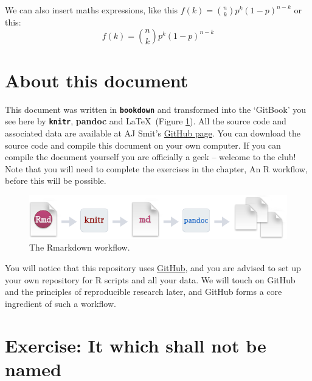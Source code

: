 \documentclass[
]{book}
\begin{document}
We can also insert maths expressions, like this \(f(k) = {n \choose k} p^{k} (1-p)^{n-k}\) or this: \[f(k) = {n \choose k} p^{k} (1-p)^{n-k}\]

\hypertarget{about-this-document}{%
\section{About this document}\label{about-this-document}}

This document was written in \textbf{\texttt{bookdown}} and transformed into the `GitBook' you see here by \textbf{\texttt{knitr}}, \textbf{pandoc} and \LaTeX~(Figure \ref{fig:rmarkdown}). All the source code and associated data are available at AJ Smit's \href{https://github.com/ajsmit/Intro_R_Workshop}{GitHub page}. You can download the source code and compile this document on your own computer. If you can compile the document yourself you are officially a geek -- welcome to the club! Note that you will need to complete the exercises in the chapter, An R workflow, before this will be possible.

\begin{figure}

{\centering \includegraphics[width=1\linewidth]{figures/RMarkdownFlow} 

}

\caption{The Rmarkdown workflow.}\label{fig:rmarkdown}
\end{figure}

You will notice that this repository uses \href{https://github.com}{GitHub}, and you are advised to set up your own repository for R scripts and all your data. We will touch on GitHub and the principles of reproducible research later, and GitHub forms a core ingredient of such a workflow.

\hypertarget{exercise-it-which-shall-not-be-named}{%
\section{Exercise: It which shall not be named}\label{exercise-it-which-shall-not-be-named}}
\end{document}
